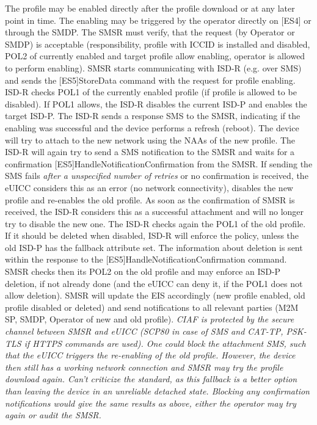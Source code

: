 The profile may be enabled directly after the profile download or at any later point in time. The enabling may be triggered by the operator directly on [ES4] or through the SMDP.
The SMSR must verify, that the request (by Operator or SMDP) is acceptable (responsibility, profile with ICCID is installed and disabled, POL2 of currently enabled and target profile allow enabling, operator is allowed to perform enabling).
SMSR starts communicating with ISD-R (e.g. over SMS) and sends the [ES5]StoreData command with the request for profile enabling. ISD-R checks POL1 of the currently enabled profile (if profile is allowed to be disabled). If POL1 allows, the ISD-R disables the current ISD-P and enables the target ISD-P. The ISD-R sends a response SMS to the SMSR, indicating if the enabling was successful and the device performs a refresh (reboot). 
The device will try to attach to the new network using the NAAs of the new profile. The ISD-R will again try to send a SMS notification to the SMSR and waits for a confirmation [ES5]HandleNotificationConfirmation from the SMSR. If sending the SMS fails \textit{after a unspecified number of retries} or no confirmation is received, the eUICC considers this as an error (no network connectivity), disables the new profile and re-enables the old profile. As soon as the confirmation of SMSR is received, the ISD-R considers this as a successful attachment and will no longer try to disable the new one.
The ISD-R checks again the POL1 of the old profile. If it should be deleted when disabled, ISD-R will enforce the policy, unless the old ISD-P has the fallback attribute set. The information about deletion is sent within the response to the [ES5]HandleNotificationConfirmation command. SMSR checks then its POL2 on the old profile and may enforce an ISD-P deletion, if not already done (and the eUICC can deny it, if the POL1 does not allow deletion).
SMSR will update the EIS accordingly (new profile enabled, old profile disabled or deleted) and send notifications to all relevant parties (M2M SP, SMDP, Operator of new and old profile). \textit{CIAF is protected by the secure channel between SMSR and eUICC (SCP80 in case of SMS and CAT-TP, PSK-TLS if HTTPS commands are used). One could block the attachment SMS, such that the eUICC triggers the re-enabling of the old profile. However, the device then still has a working network connection and SMSR may try the profile download again. Can't criticize the standard, as this fallback is a better option than leaving the device in an unreliable detached state. Blocking any confirmation notifications would give the same results as above, either the operator may try again or audit the SMSR.}


